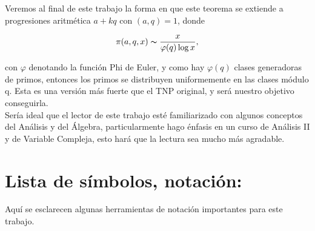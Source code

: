 Veremos al final de este trabajo la forma en que este teorema se extiende a progresiones aritmética $a+kq$ con $(a,q)=1$, donde

$$\pi(a,q,x)\thicksim \frac{x}{\varphi(q)\log x},$$

con $\varphi$ denotando la función Phi de Euler, y como hay $\varphi(q)$ clases generadoras de primos, entonces los primos se distribuyen uniformemente en las clases módulo q. Esta es una versión más fuerte que el TNP original, y será nuestro objetivo conseguirla.\\

Sería ideal que el lector de este trabajo esté familiarizado con algunos conceptos del Análisis y del Álgebra, particularmente hago énfasis en un curso de Análisis II y de Variable Compleja, esto hará que la lectura sea  mucho más agradable.

\newpage

\chapter*{Lista de símbolos, notación:}
\thispagestyle{empty}


Aquí se esclarecen algunas herramientas de notación importantes para este trabajo.


